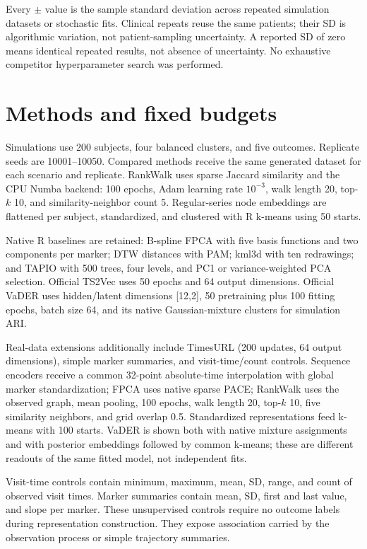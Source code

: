 \documentclass[11pt,a4paper]{article}
\begin{document}
Every $\pm$ value is the sample standard deviation across repeated simulation datasets or stochastic fits. Clinical repeats reuse the same patients; their SD is algorithmic variation, not patient-sampling uncertainty. A reported SD of zero means identical repeated results, not absence of uncertainty. No exhaustive competitor hyperparameter search was performed.

\section{Methods and fixed budgets}
Simulations use 200 subjects, four balanced clusters, and five outcomes. Replicate seeds are 10001--10050. Compared methods receive the same generated dataset for each scenario and replicate. RankWalk uses sparse Jaccard similarity and the CPU Numba backend: 100 epochs, Adam learning rate $10^{-3}$, walk length 20, top-$k$ 10, and similarity-neighbor count 5. Regular-series node embeddings are flattened per subject, standardized, and clustered with R k-means using 50 starts.

Native R baselines are retained: B-spline FPCA with five basis functions and two components per marker; DTW distances with PAM; kml3d with ten redrawings; and TAPIO with 500 trees, four levels, and PC1 or variance-weighted PCA selection. Official TS2Vec uses 50 epochs and 64 output dimensions. Official VaDER uses hidden/latent dimensions [12,2], 50 pretraining plus 100 fitting epochs, batch size 64, and its native Gaussian-mixture clusters for simulation ARI.

Real-data extensions additionally include TimesURL (200 updates, 64 output dimensions), simple marker summaries, and visit-time/count controls. Sequence encoders receive a common 32-point absolute-time interpolation with global marker standardization; FPCA uses native sparse PACE; RankWalk uses the observed graph, mean pooling, 100 epochs, walk length 20, top-$k$ 10, five similarity neighbors, and grid overlap 0.5. Standardized representations feed k-means with 100 starts. VaDER is shown both with native mixture assignments and with posterior embeddings followed by common k-means; these are different readouts of the same fitted model, not independent fits.

Visit-time controls contain minimum, maximum, mean, SD, range, and count of observed visit times. Marker summaries contain mean, SD, first and last value, and slope per marker. These unsupervised controls require no outcome labels during representation construction. They expose association carried by the observation process or simple trajectory summaries.
\end{document}
